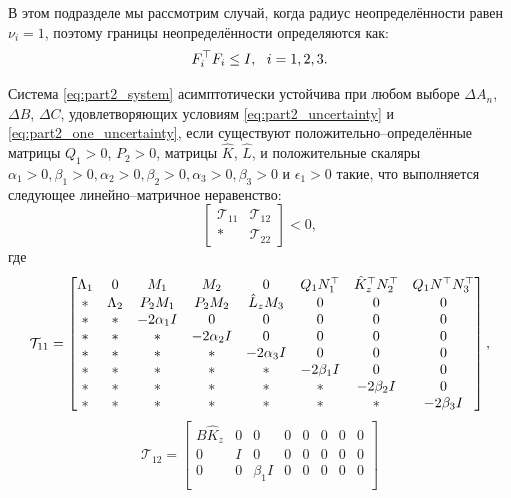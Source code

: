 В этом подразделе мы рассмотрим случай, когда радиус неопределённости равен $\nu_i = 1$, поэтому границы неопределённости определяются как:
%
\begin{equation}
	\label{eq:part2_one_uncertainty}
	{F}_i^\top{F}_i\leq {I}, \ \ i=1,2,3.
\end{equation}
%
\begin{theorem}\label{thm:part2_LMI_1}
	Система \eqref{eq:part2_system} асимптотически устойчива при любом выборе $\Delta {A}_n$, $\Delta {B}$, $\Delta {C}$, удовлетворяющих условиям \eqref{eq:part2_uncertainty} и \eqref{eq:part2_one_uncertainty}, если существуют положительно--определённые матрицы ${Q}_1>0$, ${P}_2>0$, матрицы $\hat{{K}}$, $\hat{{L}}$,
	и положительные скаляры $\alpha_1>0, \beta_1>0, \alpha_2>0, \beta_2>0, \alpha_3>0, \beta_3>0$ и $\epsilon_1 > 0$ такие, что выполняется следующее линейно--матричное неравенство:
	\begin{equation}
		\label{eq:thm3_final_LMI}
		\begin{bmatrix}
			\mathcal{T}_{11} & \mathcal{T}_{12} \\
			* & \mathcal{T}_{22}
		\end{bmatrix}<0,
	\end{equation}
	где
	\begin{equation}
		\mathcal{T}_{11}= \begin{bmatrix}
			{\Lambda}_1 & 0 & {M}_1 & {M}_2&0 & {Q}_1{N}_1^\top & \hat{{K}}_z^\top{N}_2^\top & {Q}_1 {N}^\top{N}_3^\top \\
			* & {\Lambda}_2 & {P}_2{M}_1 & {P}_2{M}_2 & \hat{{L}}_z{M}_3& 0& 0&0\\
			* & * & -2\alpha_1{I} & 0&0&0&0&0\\
			* & * &*  & -2\alpha_2{I}&0&0&0&0\\
			*& * & * &*  &-2\alpha_3{I}&0&0&0\\
			* &* & * & * & *&-2\beta_1{I}&0&0\\
			* & * & * &*& *&*&-2\beta_2{I}& 0\\
			*&*&* &* & * & * & *&-2\beta_3{I}\\
		\end{bmatrix},
	\end{equation}
	\begin{equation}
		\mathcal{T}_{12}= \begin{bmatrix}
			{B}\hat{{K}}_z & 0&0&0&0&0&0&0\\
			0&{I}&0&0&0&0&0&0\\
			0&0& \beta_1{I}&0&0&0&0&0\\

\end{bmatrix}
\end{equation}
\end{theorem}
